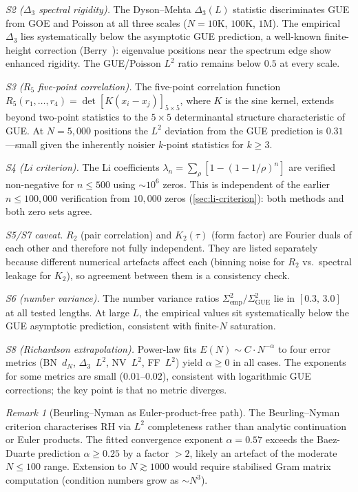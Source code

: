 \documentclass[11pt,a4paper]{article}
\theoremstyle{plain}
\theoremstyle{remark}
\newtheorem{remark}[theorem]{Remark}
\begin{document}
\smallskip
\noindent\textit{S2 ($\Delta_3$ spectral rigidity).}
The Dyson--Mehta $\Delta_3(L)$ statistic discriminates GUE from GOE and
Poisson at all three scales ($N=10\mathrm{K}$, $100\mathrm{K}$, $1\mathrm{M}$).
The empirical $\Delta_3$ lies systematically below the asymptotic GUE
prediction, a well-known finite-height correction (Berry~\cite{berry1985}):
eigenvalue positions near the spectrum edge show enhanced rigidity.
The GUE/Poisson $L^2$ ratio remains below $0.5$ at every scale.

\smallskip
\noindent\textit{S3 ($R_5$ five-point correlation).}
The five-point correlation function $R_5(r_1,\ldots,r_4) =
\det[K(x_i-x_j)]_{5\times 5}$, where $K$ is the sine kernel,
extends beyond two-point statistics to the $5\times 5$ determinantal
structure characteristic of GUE.  At $N=5{,}000$ positions the $L^2$
deviation from the GUE prediction is $0.31$---small given the
inherently noisier $k$-point statistics for $k\geq 3$.

\smallskip
\noindent\textit{S4 (Li criterion).}
The Li coefficients $\lambda_n = \sum_\rho [1-(1-1/\rho)^n]$ are
verified non-negative for $n\leq 500$ using $\sim\!10^6$ zeros.
This is independent of the earlier $n\leq 100{,}000$ verification from
$10{,}000$ zeros (\cref{sec:li-criterion}): both methods and both
zero sets agree.

\smallskip
\noindent\textit{S5/S7 caveat.}
$R_2$ (pair correlation) and $K_2(\tau)$ (form factor) are Fourier duals
of each other and therefore not fully independent.  They are listed
separately because different numerical artefacts affect each
(binning noise for $R_2$ vs.\ spectral leakage for $K_2$), so agreement
between them is a consistency check.

\smallskip
\noindent\textit{S6 (number variance).}
The number variance ratios $\Sigma^2_{\mathrm{emp}}/\Sigma^2_{\mathrm{GUE}}$
lie in $[0.3,\,3.0]$ at all tested lengths.  At large $L$,
the empirical values sit systematically below the GUE asymptotic
prediction, consistent with finite-$N$ saturation.

\smallskip
\noindent\textit{S8 (Richardson extrapolation).}
Power-law fits $E(N)\sim C\cdot N^{-\alpha}$ to four error metrics
(BN~$d_N$, $\Delta_3$~$L^2$, NV~$L^2$, FF~$L^2$) yield
$\alpha\geq 0$ in all cases.  The exponents for some metrics are small
($0.01$--$0.02$), consistent with logarithmic GUE corrections; the key
point is that no metric diverges.

\begin{remark}[Beurling--Nyman as Euler-product-free path]
\label{rem:beurling-nyman}
The Beurling--Nyman criterion characterises RH via $L^2$ completeness
rather than analytic continuation or Euler products.  The fitted
convergence exponent $\alpha=0.57$ exceeds the Baez-Duarte
prediction $\alpha\geq 0.25$ by a factor $>2$, likely an artefact of the
moderate $N\leq 100$ range.  Extension to $N\gtrsim 1000$ would require
stabilised Gram matrix computation (condition numbers grow as
$\sim\!N^3$).
\end{remark}
\end{document}
